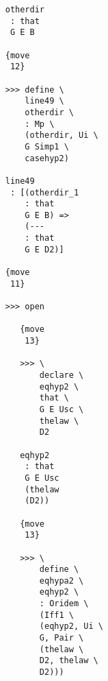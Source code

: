 \documentclass[12pt]{article}
\begin{document}
\begin{verbatim}
                                    otherdir 
                                     : that 
                                     G E B

                                    {move 
                                     12}

                                    >>> define \
                                        line49 \
                                        otherdir \
                                        : Mp \
                                        (otherdir, Ui \
                                        G Simp1 \
                                        casehyp2)

                                    line49 
                                     : [(otherdir_1 
                                        : that 
                                        G E B) => 
                                        (--- 
                                        : that 
                                        G E D2)]

                                    {move 
                                     11}

                                    >>> open

                                       {move 
                                        13}

                                       >>> \
                                           declare \
                                           eqhyp2 \
                                           that \
                                           G E Usc \
                                           thelaw \
                                           D2

                                       eqhyp2 
                                        : that 
                                        G E Usc 
                                        (thelaw 
                                        (D2))

                                       {move 
                                        13}

                                       >>> \
                                           define \
                                           eqhypa2 \
                                           eqhyp2 \
                                           : Oridem \
                                           (Iff1 \
                                           (eqhyp2, Ui \
                                           G, Pair \
                                           (thelaw \
                                           D2, thelaw \
                                           D2)))


\end{verbatim}
\end{document}
